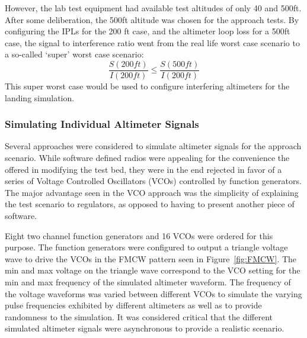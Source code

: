 However, the lab test equipment had available test altitudes of only 40 and 500ft. After some deliberation, the 500ft altitude was chosen for the approach tests. By configuring the IPLs for the 200 ft case, and the altimeter loop loss for a 500ft case, the signal to interference ratio went from the real life worst case scenario to a so-called `super' worst case scenario: $$\frac{S(200ft)}{I(200ft)}\leq\frac{S(500ft)}{I(200ft)}$$
This super worst case would be used to configure interfering altimeters for the landing simulation.


\subsubsection{Simulating Individual Altimeter Signals}
Several approaches were considered to simulate altimeter signals for the approach scenario. While software defined radios were appealing for the convenience the offered in modifying the test bed, they were in the end rejected in favor of a series of Voltage Controlled Oscillators (VCOs) controlled by function generators. The major advantage seen in the VCO approach was the simplicity of explaining the test scenario to regulators, as opposed to having to present another piece of software.

Eight two channel function generators and 16 VCOs were ordered for this purpose. The function generators were configured to output a triangle voltage wave to drive the VCOs in the FMCW pattern seen in Figure~\ref{fig:FMCW}. The min and max voltage on the triangle wave correspond to the VCO setting for the min and max frequency of the simulated altimeter waveform. The frequency of the voltage waveforms was varied between different VCOs to simulate the varying pulse frequencies exhibited by different altimeters as well as to provide randomness to the simulation. It was considered critical that the different simulated altimeter signals were asynchronous to provide a realistic scenario. 


